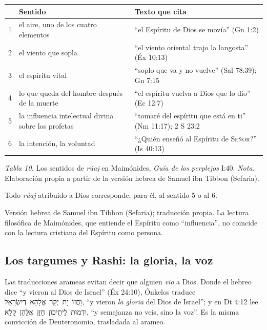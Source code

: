 \documentclass[11pt,letterpaper]{article}
\newcommand{\heb}[1]{\mbox{\foreignlanguage{hebrew}{#1}}}
\newcommand{\SENOR}{\textsc{Señor}}
\begin{document}
\begin{center}\small\renewcommand{\arraystretch}{1.18}
\begin{tabular}{@{}L{0.6cm}L{5.6cm}L{8.0cm}@{}}
\toprule
& \textbf{Sentido} & \textbf{Texto que cita} \\  & el aire, uno de los cuatro elementos & ``el Espíritu de Dios se movía'' (Gn 1:2) \\
2 & el viento que sopla & ``el viento oriental trajo la langosta'' (Éx 10:13) \\
3 & el espíritu vital & ``soplo que va y no vuelve'' (Sal 78:39); Gn 7:15 \\
4 & lo que queda del hombre después de la muerte & ``el espíritu vuelva a Dios que lo dio'' (Ec 12:7) \\
5 & la influencia intelectual divina sobre los profetas & ``tomaré del espíritu que está en ti'' (Nm 11:17); 2 S 23:2 \\
6 & la intención, la voluntad & ``¿Quién enseñó al Espíritu de \SENOR?'' (Is 40:13) \\
\bottomrule
\end{tabular}\par
{\footnotesize\color{gris}\textit{Tabla 10.} Los sentidos de \emph{rúaj} en Maimónides, \emph{Guía de los perplejos} I:40. \textit{Nota.} Elaboración propia a partir de la versión hebrea de Samuel ibn Tibbon (Sefaria).}
\end{center}

Todo \emph{rúaj} atribuido a Dios corresponde, para él, al sentido 5 o al 6.

\begin{nota}[Precisión]
Versión hebrea de Samuel ibn Tibbon (Sefaria); traducción propia. La lectura filosófica de Maimónides, que entiende el Espíritu como ``influencia'', no coincide con la lectura cristiana del Espíritu como persona.
\end{nota}

\subsection{Los targumes y Rashi: la gloria, la voz}

Las traducciones arameas evitan decir que alguien \emph{vio} a Dios. Donde el hebreo dice ``y vieron al Dios de Israel'' (Éx 24:10), Ónkelos traduce \heb{וַחֲזוֹ יָת יְקַר אֱלָהָא דְיִשְׂרָאֵל}, ``y vieron \emph{la gloria} del Dios de Israel''; y en Dt 4:12 lee \heb{וּדְמוּת לֵיתֵיכוֹן חָזָן אֶלָּהֵן קָלָא}, ``y semejanza no veis, sino la voz''. Es la misma convicción de Deuteronomio, trasladada al arameo.
\end{document}
